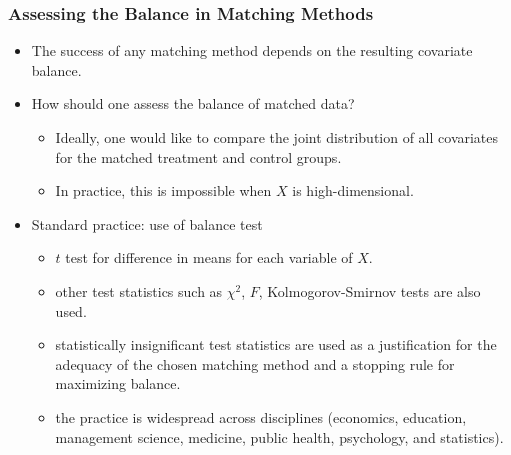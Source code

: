 \documentclass[trans]{beamer}
\begin{document}
\begin{frame}
  \frametitle{Assessing the Balance in Matching Methods}

\begin{itemize}
\item The success of any matching method depends on the resulting
  covariate balance.
  
\item How should one assess the balance of matched data?
  \begin{itemize}
    
  \item Ideally, one would like to compare the joint distribution of
    all covariates for the matched treatment and control groups.
    
  \item In practice, this is impossible when $X$ is high-dimensional.
  \end{itemize}

\item Standard practice: use of balance test
  \begin{itemize}
  \item $t$ test for difference in means for each variable of $X$.
  \item other test statistics such as $\chi^2$, $F$,
    Kolmogorov-Smirnov tests are also used.
  \item statistically insignificant test statistics are used as a
    justification for the adequacy of the chosen matching method and
    a stopping rule for maximizing balance.
  \item the practice is widespread across disciplines (economics,
    education, management science, medicine, public health,
    psychology, and statistics).
  \end{itemize}

\end{itemize}
\end{frame}

\end{document}
